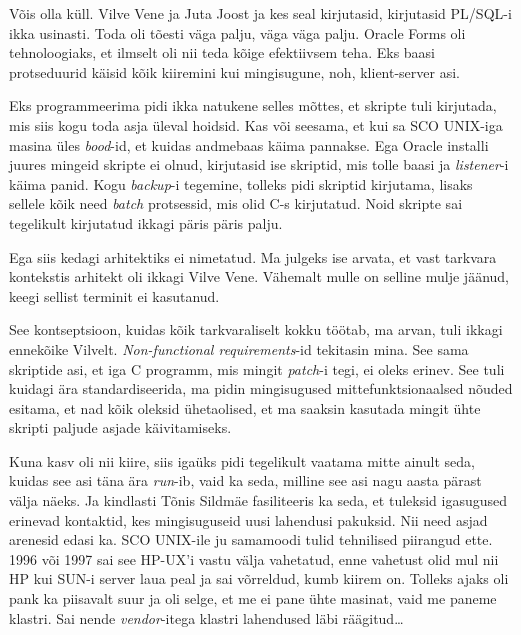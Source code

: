 Võis olla küll. Vilve Vene ja Juta 
Joost ja kes seal kirjutasid, kirjutasid PL/SQL-i ikka 
usinasti. Toda oli tõesti väga palju, väga väga palju. Oracle Forms 
oli tehnoloogiaks, et ilmselt oli nii teda kõige efektiivsem teha. Eks 
 baasi protseduurid käisid kõik kiiremini kui mingisugune, noh, 
klient-server asi.


Eks programmeerima pidi ikka natukene selles mõttes, et skripte tuli kirjutada, 
mis  siis kogu toda asja üleval hoidsid. Kas või seesama, et kui sa SCO 
UNIX-iga masina üles \emph{bood}-id, et kuidas andmebaas käima pannakse. Ega 
 Oracle installi juures mingeid skripte ei olnud, kirjutasid ise 
 skriptid, mis tolle baasi ja \emph{listener}-i käima panid. Kogu 
\emph{backup}-i tegemine, tolleks pidi skriptid kirjutama, lisaks sellele kõik 
need \emph{batch} protsessid, mis olid C-s kirjutatud. 
Noid skripte  sai tegelikult kirjutatud ikkagi päris päris palju.


Ega siis kedagi arhitektiks ei nimetatud. Ma julgeks ise arvata, et vast 
tarkvara kontekstis arhitekt oli ikkagi Vilve Vene. 
Vähemalt  mulle on selline mulje jäänud, keegi sellist terminit ei kasutanud. 

See kontseptsioon, kuidas  kõik tarkvaraliselt kokku töötab, ma arvan, tuli 
ikkagi ennekõike Vilvelt. \emph{Non-functional requirements}-id tekitasin mina. 
See sama skriptide asi, et iga  C programm, mis mingit \emph{patch}-i tegi, ei 
oleks erinev. See tuli kuidagi ära standardiseerida,  ma pidin mingisugused  
mittefunktsionaalsed nõuded esitama, et nad kõik oleksid ühetaolised, et ma 
saaksin kasutada mingit ühte skripti paljude asjade käivitamiseks.


Kuna  kasv oli nii kiire, siis igaüks pidi tegelikult vaatama  mitte ainult 
seda, kuidas see asi täna ära \emph{run}-ib, vaid ka seda, milline see asi nagu 
aasta pärast välja näeks. Ja kindlasti Tõnis Sildmäe 
fasiliteeris ka seda, et tuleksid igasugused erinevad kontaktid, kes 
mingisuguseid uusi lahendusi pakuksid. Nii need 
asjad arenesid edasi ka. SCO UNIX-ile ju samamoodi  tulid tehnilised piirangud 
ette. 1996 või 1997 sai see HP-UX'i vastu välja vahetatud, enne 
vahetust olid mul nii HP kui SUN-i server laua peal ja sai võrreldud, kumb  
kiirem on. Tolleks ajaks oli pank ka piisavalt suur ja oli selge, et me  ei 
pane ühte masinat, vaid me paneme klastri. Sai nende \emph{vendor}-itega  
klastri lahendused läbi räägitud\ldots

